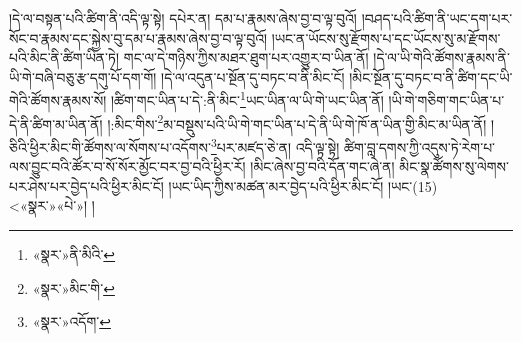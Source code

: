 །དེ་ལ་བསྟན་པའི་ཚིག་ནི་འདི་ལྟ་སྟེ། དཔེར་ན། དམ་པ་རྣམས་ཞེས་བྱ་བ་ལྟ་བུའོ། །བཤད་པའི་ཚིག་ནི་ཡང་དག་པར་སོང་བ་རྣམས་དང་སྐྱེས་བུ་དམ་པ་རྣམས་ཞེས་བྱ་བ་ལྟ་བུའོ། །ཡང་ན་ཡོངས་སུ་རྫོགས་པ་དང་ཡོངས་སུ་མ་རྫོགས་པའི་མིང་ནི་ཚིག་ཡིན་ཏེ། གང་ལ་དེ་གཉིས་ཀྱིས་མཐར་ཐུག་པར་འགྱུར་བ་ཡིན་ནོ། །དེ་ལ་ཡི་གེའི་ཚོགས་རྣམས་ནི་ཡི་གེ་བཞི་བཅུ་རྩ་དགུ་པོ་དག་གོ། །དེ་ལ་འདུན་པ་སྔོན་དུ་བཏང་བ་ནི་མིང་ངོ། །མིང་སྔོན་དུ་བཏང་བ་ནི་ཚིག་དང་ཡི་གེའི་ཚོགས་རྣམས་སོ། །ཚིག་གང་ཡིན་པ་དེ་:ནི་མིང་\footnote{«སྣར་»ནི་མིའི་}ཡང་ཡིན་ལ་ཡི་གེ་ཡང་ཡིན་ནོ། །ཡི་གེ་གཅིག་གང་ཡིན་པ་དེ་ནི་ཚིག་མ་ཡིན་ནོ། །:མིང་གིས་\footnote{«སྣར་»མིང་གི་}མ་བསྡུས་པའི་ཡི་གེ་གང་ཡིན་པ་དེ་ནི་ཡི་གེ་ཁོ་ན་ཡིན་གྱི་མིང་མ་ཡིན་ནོ། །ཅིའི་ཕྱིར་མིང་གི་ཚོགས་ལ་སོགས་པ་འདོགས་\footnote{«སྣར་»འདོག་}པར་མཛད་ཅེ་ན། འདི་ལྟ་སྟེ། ཚིག་བླ་དགས་ཀྱི་འདུས་ཏེ་རེག་པ་ལས་བྱུང་བའི་ཚོར་བ་སོ་སོར་མྱོང་བར་བྱ་བའི་ཕྱིར་རོ། །མིང་ཞེས་བྱ་བའི་དོན་གང་ཞེ་ན། མིང་སྣ་ཚོགས་སུ་ལེགས་པར་ཤེས་པར་བྱེད་པའི་ཕྱིར་མིང་ངོ། །ཡང་ཡིད་ཀྱིས་མཚན་མར་བྱེད་པའི་ཕྱིར་མིང་ངོ། །ཡང་(15) <«སྣར་»«པེ་»། །
